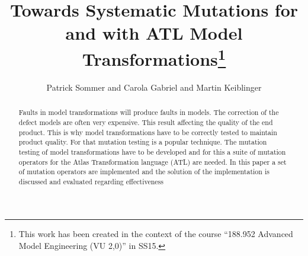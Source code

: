 \documentclass{llncs}
\begin{document}
\pagestyle{plain}

\title{Towards Systematic Mutations for and with ATL Model Transformations\footnote{This work has been created in the context of the course ``188.952 Advanced Model Engineering (VU 2,0)'' in SS15.}}


\author{Patrick Sommer and Carola Gabriel and Martin Keiblinger}


\maketitle

\begin{abstract}

Faults in model transformations will produce faults in models. The correction of the defect models are often very expensive. This result affecting the quality of the end product. This is why model transformations have to be correctly tested to maintain product quality. For that mutation testing is a popular technique.  The mutation testing of model transformations have to be developed and for this a suite of mutation operators for the Atlas Transformation language (ATL) are needed. In this paper a set of mutation operators are implemented and the solution of the implementation is discussed and evaluated regarding effectiveness

\end{abstract}

\tableofcontents
\newpage
\end{document}
